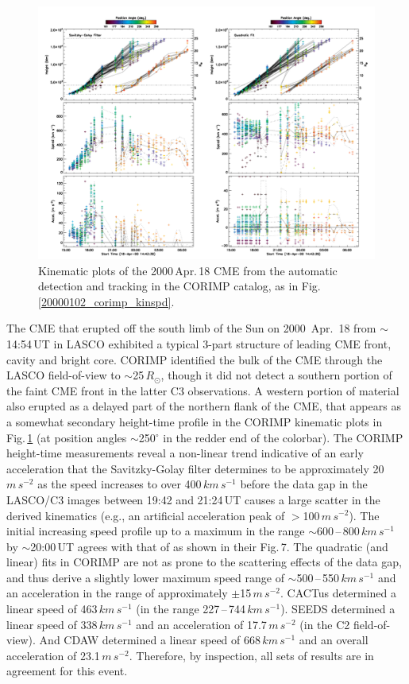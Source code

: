 \documentclass[referee,a4paper,12pt,traditabstract]{swsc}
\begin{document}
\begin{figure}[t]
\centerline{\includegraphics[width=\linewidth]{20000418_corimp_kinspd.pdf}}
\caption{Kinematic plots of the 2000\,Apr.\,18 CME from the automatic detection and tracking in the CORIMP catalog, as in Fig.\,\ref{20000102_corimp_kinspd}.}
\label{20000418_corimp_kinspd}
\end{figure}

The CME that erupted off the south limb of the Sun on 2000~Apr.~18 from $\sim$14:54\,UT in LASCO exhibited a typical 3-part structure of leading CME front, cavity and bright core. CORIMP identified the bulk of the CME through the LASCO field-of-view to $\sim$25\,$R_\odot$, though it did not detect a southern portion of the faint CME front in the latter C3 observations. A western portion of material also erupted as a delayed part of the northern flank of the CME, that appears as a somewhat secondary height-time profile in the CORIMP kinematic plots in Fig.\,\ref{20000418_corimp_kinspd} (at position angles $\sim$250$^{\circ}$ in the redder end of the colorbar). The CORIMP height-time measurements reveal a non-linear trend indicative of an early acceleration that the Savitzky-Golay filter determines to be approximately 20\,$m\,s^{-2}$ as the speed increases to over 400\,$km\,s^{-1}$ before the data gap in the LASCO/C3 images between 19:42 and 21:24\,UT causes a large scatter in the derived kinematics (e.g., an artificial acceleration peak of $>$100\,$m\,s^{-2}$). The initial increasing speed profile up to a maximum in the range $\sim$600\,--\,800\,$km\,s^{-1}$ by $\sim$20:00\,UT agrees with that of \cite{2009A&A...495..325B} as shown in their Fig.\,7. The quadratic (and linear) fits in CORIMP are not as prone to the scattering effects of the data gap, and thus derive a slightly lower maximum speed range of $\sim$500\,--\,550\,$km\,s^{-1}$ and an acceleration in the range of approximately $\pm$15\,$m\,s^{-2}$. CACTus determined a linear speed of 463$\,km\,s^{-1}$ (in the range 227\,--\,744\,$km\,s^{-1}$). SEEDS determined a linear speed of 338$\,km\,s^{-1}$ and an acceleration of 17.7\,$m\,s^{-2}$ (in the C2 field-of-view). And CDAW determined a linear speed of 668$\,km\,s^{-1}$ and an overall acceleration of 23.1\,$m\,s^{-2}$. Therefore, by inspection, all sets of results are in agreement for this event.
\end{document}
